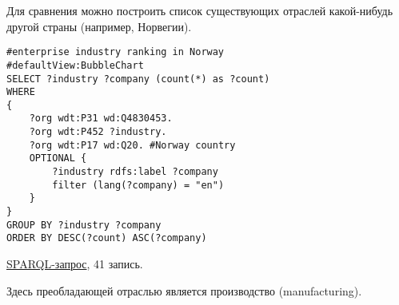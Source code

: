 Для сравнения можно построить список существующих отраслей какой-нибудь другой страны (например, Норвегии).

\begin{lstlisting}[language=SPARQL]
#enterprise industry ranking in Norway
#defaultView:BubbleChart
SELECT ?industry ?company (count(*) as ?count) 
WHERE 
{
    ?org wdt:P31 wd:Q4830453.
    ?org wdt:P452 ?industry.
    ?org wdt:P17 wd:Q20. #Norway country
    OPTIONAL {
		?industry rdfs:label ?company
		filter (lang(?company) = "en")
	}
}
GROUP BY ?industry ?company
ORDER BY DESC(?count) ASC(?company)
\end{lstlisting}

\href{https://query.wikidata.org/#%23enterprise%20industry%20ranking%20in%20Norway%0A%23defaultView%3ABubbleChart%0ASELECT%20%3Findustry%20%3Fcompany%20%28count%28%2a%29%20as%20%3Fcount%29%20%0AWHERE%20%0A%7B%0A%20%20%20%20%3Forg%20wdt%3AP31%20wd%3AQ4830453.%0A%20%20%20%20%3Forg%20wdt%3AP452%20%3Findustry%20.%0A%20%20%20%20%3Forg%20wdt%3AP17%20wd%3AQ20.%20%23Norway%20country%0A%20%20%20%20OPTIONAL%20%7B%0A%09%09%3Findustry%20rdfs%3Alabel%20%3Fcompany%0A%09%09filter%20%28lang%28%3Fcompany%29%20%3D%20%22en%22%29%0A%09%7D%0A%7D%0AGROUP%20BY%20%3Findustry%20%3Fcompany%0AORDER%20BY%20DESC%28%3Fcount%29%20ASC%28%3Fcompany%29%0A}{SPARQL-запрос}, 41 запись.

Здесь преобладающей отраслью является производство (manufacturing).